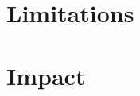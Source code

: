 \documentclass[11pt,a4paper,oneside]{report}
\begin{document}
\section*{Limitations}


\section*{Impact}



\nocite{*} %


\end{document}
